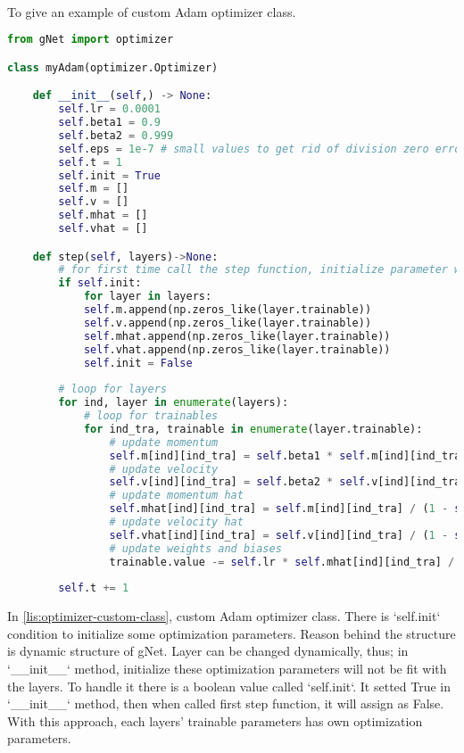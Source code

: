 \documentclass[12pt]{report}
\begin{document}
\paragraph{}
To give an example of custom Adam optimizer class.


\begin{lstlisting}[language=Python, numbers=none, caption={Custom optimizer class.}, label={lis:optimizer-custom-class}]
from gNet import optimizer

class myAdam(optimizer.Optimizer)

    def __init__(self,) -> None:
		self.lr = 0.0001
		self.beta1 = 0.9
		self.beta2 = 0.999
		self.eps = 1e-7 # small values to get rid of division zero error.
		self.t = 1
		self.init = True
		self.m = []
		self.v = []
		self.mhat = []
		self.vhat = []

	def step(self, layers)->None:
		# for first time call the step function, initialize parameter w.r.t layer size and trainable variable size.
		if self.init:
			for layer in layers:
			self.m.append(np.zeros_like(layer.trainable))
			self.v.append(np.zeros_like(layer.trainable))
			self.mhat.append(np.zeros_like(layer.trainable))
			self.vhat.append(np.zeros_like(layer.trainable))
			self.init = False
		
		# loop for layers
		for ind, layer in enumerate(layers):
			# loop for trainables
			for ind_tra, trainable in enumerate(layer.trainable):    
				# update momentum
				self.m[ind][ind_tra] = self.beta1 * self.m[ind][ind_tra] + (1 - self.beta1) * trainable.grad.value
				# update velocity
				self.v[ind][ind_tra] = self.beta2 * self.v[ind][ind_tra] + (1 - self.beta2) * (trainable.grad.value ** 2)
				# update momentum hat
				self.mhat[ind][ind_tra] = self.m[ind][ind_tra] / (1 - self.beta1 ** self.t)
				# update velocity hat
				self.vhat[ind][ind_tra] = self.v[ind][ind_tra] / (1 - self.beta2 ** self.t)
				# update weights and biases
				trainable.value -= self.lr * self.mhat[ind][ind_tra] / (np.sqrt(self.vhat[ind][ind_tra]) + self.eps)
				
		self.t += 1

\end{lstlisting}

In \ref{lis:optimizer-custom-class}, custom Adam optimizer class. There is `self.init` condition to initialize some optimization parameters. Reason behind the structure is dynamic structure of gNet. Layer can be changed dynamically, thus; in `\_\_init\_\_` method, initialize these optimization parameters will not be fit with the layers. To handle it there is a boolean value called `self.init`. It setted True in `\_\_init\_\_` method, then when called first step function, it will assign as False. With this approach, each layers' trainable parameters has own optimization parameters. 
\end{document}
